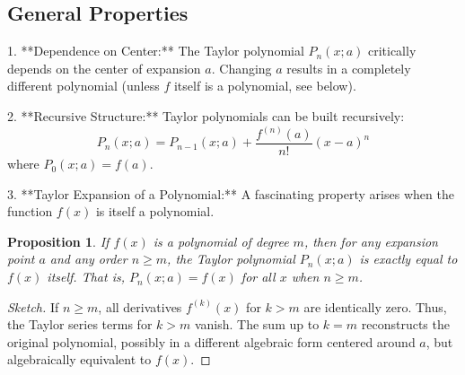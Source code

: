 \documentclass[11pt]{article}
\newtheorem{proposition}[theorem]{Proposition}
\theoremstyle{definition}
\theoremstyle{remark}
\begin{document}
\subsection{General Properties}

1.  **Dependence on Center:** The Taylor polynomial $P_n(x; a)$ critically depends on the center of expansion $a$. Changing $a$ results in a completely different polynomial (unless $f$ itself is a polynomial, see below).

2.  **Recursive Structure:** Taylor polynomials can be built recursively:
    \[ P_n(x; a) = P_{n-1}(x; a) + \frac{f^{(n)}(a)}{n!}(x-a)^n \]
    where $P_0(x; a) = f(a)$.

3.  **Taylor Expansion of a Polynomial:** A fascinating property arises when the function $f(x)$ is itself a polynomial.
    \begin{proposition}
    If $f(x)$ is a polynomial of degree $m$, then for any expansion point $a$ and any order $n \ge m$, the Taylor polynomial $P_n(x; a)$ is exactly equal to $f(x)$ itself. That is, $P_n(x; a) = f(x)$ for all $x$ when $n \ge m$.
    \end{proposition}
    \begin{proof}[Sketch]
    If $n \ge m$, all derivatives $f^{(k)}(x)$ for $k > m$ are identically zero. Thus, the Taylor series terms for $k > m$ vanish. The sum up to $k=m$ reconstructs the original polynomial, possibly in a different algebraic form centered around $a$, but algebraically equivalent to $f(x)$.
    \end{proof}
\end{document}
